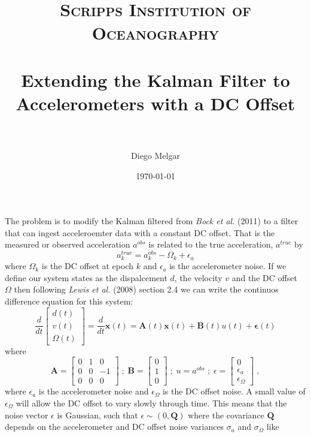 \documentclass[paper=a4, fontsize=11pt]{scrartcl} %
\title{	
\normalfont \normalsize 
\textsc{Scripps Institution of Oceanography} \\ [25pt] %
\horrule{0.5pt} \\[0.4cm] %
\huge Extending the Kalman Filter to Accelerometers with a DC Offset \\ %
\horrule{2pt} \\[0.5cm] %
}
\author{Diego Melgar} %
\date{\normalsize\today} %
\numberwithin{equation}{section} %
\numberwithin{figure}{section} %
\numberwithin{table}{section} %
\begin{document}
\maketitle %


\section{}

The problem is to modify the Kalman filtered from \textit{Bock et al.} (2011) to a filter that can ingest acceleroemter data with a constant DC offset. That is the measured or observed acceleration $a^{obs}$ is related to the true acceleration, $a^{true}$ by
$$
a_k^{true}=a_k^{obs}-\Omega_k+\epsilon_a
$$
where $\Omega_k$ is the DC offset at epoch $k$ and $\epsilon_a$ is the accelerometer noise. If we define our system states as the dispalcement $d$, the velocity $v$ and the DC offset $\Omega$ then following \textit{Lewis et al.} (2008) section 2.4 we can write the continuos difference equation for this system:
$$
\frac{d}{dt}
\left[\begin{matrix}
  d(t) \\
  v(t) \\
  \Omega(t)
\end{matrix}\right]
=\frac{d}{dt}\mathbf{x}(t)
=\mathbf{A}(t)\mathbf{x}(t)+\mathbf{B}(t)u(t)+\mathbf{\epsilon}(t)
$$
where
$$
\mathbf{A}=
\left[\begin{matrix}
0 & 1 & 0 \\
0 & 0 & -1 \\
0 & 0 & 0
\end{matrix}\right]
\;;\;
\mathbf{B}=
\left[\begin{matrix}
0 \\
1 \\
0
\end{matrix}\right]\;;\;u=a^{obs}\;;\;\epsilon=
\left[\begin{matrix}
0 \\
\epsilon_a\\
\epsilon_\Omega
\end{matrix}\right]\;,
$$
where $\epsilon_a$ is the accelerometer noise and $\epsilon_\Omega$ is the DC offset noise. A small value of $\epsilon_\Omega$ will allow the DC offset to vary slowly through time. This means that the noise vector $\epsilon$ is Gaussian, such that $\epsilon\sim(0,\mathbf{Q})$ where the covariance $\mathbf{Q}$ depends on the accelerometer and DC offset noise variances $\sigma_a$ and $\sigma_\Omega$ like
\end{document}
